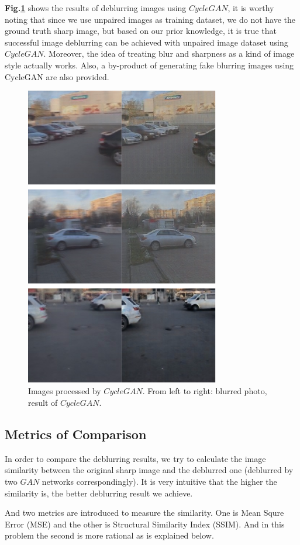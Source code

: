 \documentclass[journal]{IEEEtran}
\begin{document}
\textbf{Fig.\ref{fig:cyclegan}} shows the results of deblurring images using $CycleGAN$, it is worthy noting that since we use unpaired images as training dataset, we do not have the ground truth sharp image, but based on our prior knowledge, it is true that successful image deblurring can be achieved with unpaired image dataset using $CycleGAN$. Moreover, the idea of treating blur and sharpness as a kind of image style actually works. Also, a by-product of generating fake blurring images using CycleGAN are also provided.

\begin{figure}[htbp]
	\centering
	\includegraphics[width=8.5cm]{fig/cyclegan.png}
	\caption{ Images processed by $CycleGAN$. From left to right: blurred photo, result of $CycleGAN$.}
	\label{fig:cyclegan}
\end{figure}
\subsection{Metrics of Comparison}
In order to compare the deblurring results, we try to calculate the image similarity between the original sharp image and the deblurred one (deblurred by two $GAN$ networks correspondingly). It is very intuitive that the higher the similarity is, the better deblurring result we achieve.

And two metrics are introduced to measure the similarity. One is Mean Squre Error (MSE) and the other is Structural Similarity Index\cite{ssim} (SSIM). And in this problem the second is more rational as is explained below.
\end{document}
